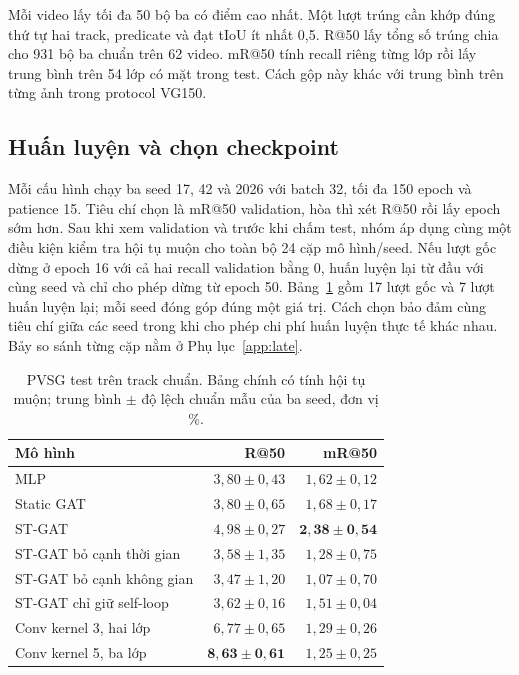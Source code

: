 Mỗi video lấy tối đa 50 bộ ba có điểm cao nhất. Một lượt trúng cần khớp
đúng thứ tự hai track, predicate và đạt tIoU ít nhất 0,5. R@50 lấy tổng
số trúng chia cho 931 bộ ba chuẩn trên 62 video. mR@50 tính recall riêng
từng lớp rồi lấy trung bình trên 54 lớp có mặt trong test. Cách gộp này khác
với trung bình trên từng ảnh trong protocol VG150.

\subsection{Huấn luyện và chọn checkpoint}
Mỗi cấu hình chạy ba seed 17, 42 và 2026 với batch 32, tối đa 150 epoch
và patience 15. Tiêu chí chọn là mR@50 validation, hòa thì xét R@50 rồi
lấy epoch sớm hơn. Sau khi xem validation và trước khi chấm test, nhóm
áp dụng cùng một điều kiện kiểm tra hội tụ muộn cho toàn bộ 24 cặp mô hình/seed.
Nếu lượt gốc dừng ở epoch 16 với cả hai recall validation bằng 0, huấn
luyện lại từ đầu với cùng seed và chỉ cho phép dừng từ epoch 50.
Bảng~\ref{tab:pvsg} gồm 17 lượt gốc và 7 lượt huấn luyện lại; mỗi seed
đóng góp đúng một giá trị. Cách chọn bảo đảm cùng tiêu chí giữa các seed
trong khi cho phép chi phí huấn luyện thực tế khác nhau. Bảy so sánh từng
cặp nằm ở Phụ lục~\ref{app:late}.

\begin{table}[!ht]\centering
\caption{PVSG test trên track chuẩn. Bảng chính có tính hội tụ muộn;
trung bình $\pm$ độ lệch chuẩn mẫu của ba seed, đơn vị \%.}\label{tab:pvsg}
\small\setlength{\tabcolsep}{3pt}
\begin{tabular}{@{}lrr@{}}\toprule
Mô hình & R@50 & mR@50\\\midrule
MLP & $3,80\pm0,43$ & $1,62\pm0,12$\\
Static GAT & $3,80\pm0,65$ & $1,68\pm0,17$\\
ST-GAT & $4,98\pm0,27$ & $\mathbf{2,38\pm0,54}$\\
ST-GAT bỏ cạnh thời gian & $3,58\pm1,35$ & $1,28\pm0,75$\\
ST-GAT bỏ cạnh không gian & $3,47\pm1,20$ & $1,07\pm0,70$\\
ST-GAT chỉ giữ self-loop & $3,62\pm0,16$ & $1,51\pm0,04$\\
Conv kernel 3, hai lớp & $6,77\pm0,65$ & $1,29\pm0,26$\\
Conv kernel 5, ba lớp & $\mathbf{8,63\pm0,61}$ & $1,25\pm0,25$\\
\bottomrule\end{tabular}
\end{table}

